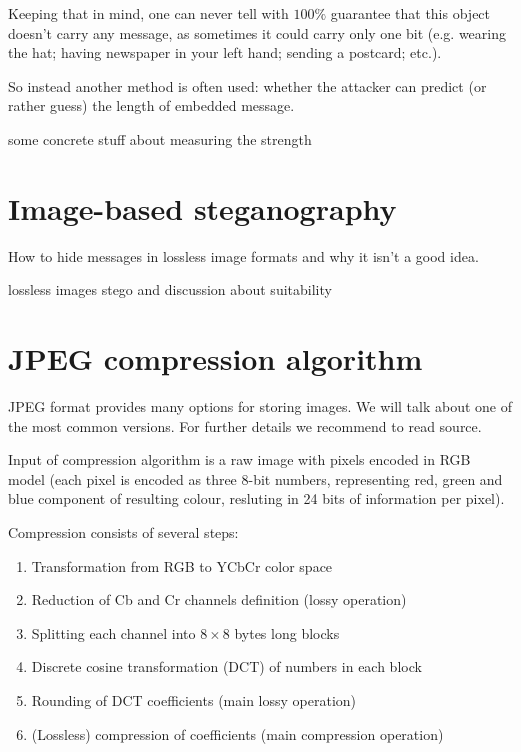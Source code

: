Keeping that in mind, one can never tell with $100\%$
guarantee that this object doesn't carry any message, as sometimes it could carry only one bit 
(e.g. wearing the hat; having newspaper in your left hand; sending a postcard; etc.).

So instead another method is often used: whether the attacker can predict (or rather guess) the
length of embedded message.

\TODO some concrete stuff about measuring the strength

\section{Image-based steganography}
\label{sec:image-steganography}

How to hide messages in lossless image formats and why it isn't a good idea.

\TODO lossless images stego and discussion about suitability

\section{JPEG compression algorithm}
\label{sec:jpeg}

JPEG format provides many options for storing images. We will talk about
one of the most common versions. For further details we recommend to read \TODO source.

Input of compression algorithm is a raw image with pixels encoded
in RGB model (each pixel is encoded as three 8-bit numbers, representing
red, green and blue component of resulting colour, resluting in 24 bits of information
per pixel).

Compression consists of several steps:
\begin{enumerate}
    \item Transformation from RGB to YCbCr color space
    \item Reduction of Cb and Cr channels definition (lossy operation)
    \item Splitting each channel into $8 \times 8$ bytes long blocks 
    \item Discrete cosine transformation (DCT) of numbers in each block
    \item Rounding of DCT coefficients (main lossy operation)
    \item (Lossless) compression of coefficients (main compression operation)
\end{enumerate}

